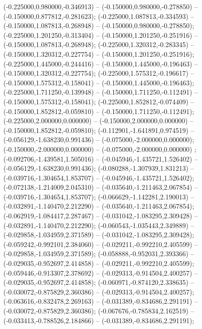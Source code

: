  (-0.225000,0.980000,-0.346913) -- (-0.150000,0.980000,-0.278850) -- (-0.150000,0.877812,-0.281623);
 (-0.225000,1.087813,-0.334593) -- (-0.150000,1.087813,-0.268948) -- (-0.150000,0.980000,-0.278850);
 (-0.225000,1.201250,-0.313404) -- (-0.150000,1.201250,-0.251916) -- (-0.150000,1.087813,-0.268948);
 (-0.225000,1.320312,-0.283345) -- (-0.150000,1.320312,-0.227754) -- (-0.150000,1.201250,-0.251916);
 (-0.225000,1.445000,-0.244416) -- (-0.150000,1.445000,-0.196463) -- (-0.150000,1.320312,-0.227754);
 (-0.225000,1.575312,-0.196617) -- (-0.150000,1.575312,-0.158041) -- (-0.150000,1.445000,-0.196463);
 (-0.225000,1.711250,-0.139948) -- (-0.150000,1.711250,-0.112491) -- (-0.150000,1.575312,-0.158041);
 (-0.225000,1.852812,-0.074409) -- (-0.150000,1.852812,-0.059810) -- (-0.150000,1.711250,-0.112491);
 (-0.225000,2.000000,0.000000) -- (-0.150000,2.000000,0.000000) -- (-0.150000,1.852812,-0.059810);
 (-0.112901,-1.641891,0.974519) -- (-0.056129,-1.638230,0.991436) -- (-0.075000,-2.000000,0.000000);
 (-0.150000,-2.000000,0.000000) -- (-0.075000,-2.000000,0.000000) ;
 (-0.092706,-1.439581,1.505016) -- (-0.045946,-1.435721,1.526402) -- (-0.056129,-1.638230,0.991436);
 (-0.080288,-1.307939,1.831213) -- (-0.039716,-1.304654,1.853707) -- (-0.045946,-1.435721,1.526402);
 (-0.072138,-1.214009,2.045310) -- (-0.035640,-1.211463,2.067854) -- (-0.039716,-1.304654,1.853707);
 (-0.066629,-1.142281,2.190013) -- (-0.032891,-1.140470,2.212290) -- (-0.035640,-1.211463,2.067854);
 (-0.062919,-1.084417,2.287467) -- (-0.031042,-1.083295,2.309428) -- (-0.032891,-1.140470,2.212290);
 (-0.060543,-1.035443,2.349889) -- (-0.029858,-1.034959,2.371589) -- (-0.031042,-1.083295,2.309428);
 (-0.059242,-0.992101,2.384060) -- (-0.029211,-0.992210,2.405599) -- (-0.029858,-1.034959,2.371589);
 (-0.058888,-0.952031,2.393366) -- (-0.029035,-0.952697,2.414858) -- (-0.029211,-0.992210,2.405599);
 (-0.059446,-0.913307,2.378692) -- (-0.029313,-0.914504,2.400257) -- (-0.029035,-0.952697,2.414858);
 (-0.060971,-0.874120,2.338635) -- (-0.030072,-0.875829,2.360386) -- (-0.029313,-0.914504,2.400257);
 (-0.063616,-0.832478,2.269163) -- (-0.031389,-0.834686,2.291191) -- (-0.030072,-0.875829,2.360386);
 (-0.067676,-0.785834,2.162519) -- (-0.033413,-0.788526,2.184866) -- (-0.031389,-0.834686,2.291191);
